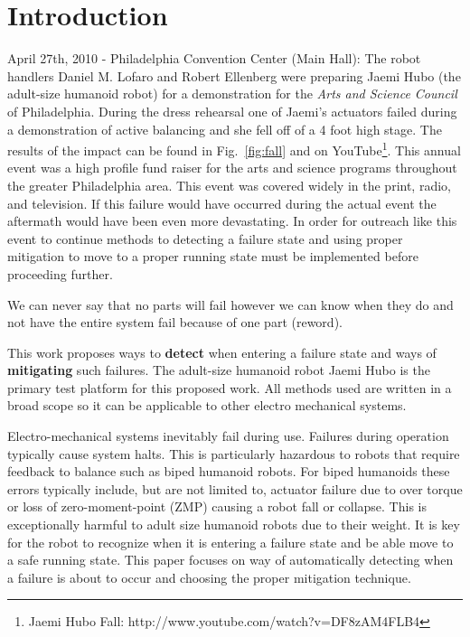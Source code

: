 \section{Introduction}

April 27th, 2010 - Philadelphia Convention Center (Main Hall):  The robot handlers Daniel M. Lofaro and Robert Ellenberg were preparing Jaemi Hubo (the adult-size humanoid robot) for a demonstration for the \textit{Arts and Science Council} of Philadelphia.  During the dress rehearsal one of Jaemi's actuators failed during a demonstration of active balancing and she fell off of a 4 foot high stage.  The results of the impact can be found in Fig.~\ref{fig:fall} and on YouTube\footnote{Jaemi Hubo Fall: http://www.youtube.com/watch?v=DF8zAM4FLB4\label{link:fall}}.  This annual event was a high profile fund raiser for the arts and science programs throughout the greater Philadelphia area.  This event was covered widely in the print, radio, and television.  If this failure would have occurred during the actual event the aftermath would have been even more devastating.  In order for outreach like this event to continue methods to detecting a failure state and using proper mitigation to move to a proper running state must be implemented before proceeding further.

We can never say that no parts will fail however we can know when they do and not have the entire system fail because of one part (reword).

This work proposes ways to \textbf{detect} when entering a failure state and ways of \textbf{mitigating} such failures.  The adult-size humanoid robot Jaemi Hubo is the primary test platform for this proposed work.  All methods used are written in a broad scope so it can be applicable to other electro mechanical systems.




Electro-mechanical systems inevitably fail during use.  Failures during operation typically cause system halts.  This is particularly hazardous to robots that require feedback to balance such as biped humanoid robots.  For biped humanoids these errors typically include, but are not limited to, actuator failure due to over torque or loss of zero-moment-point (ZMP) \cite{zmp35} causing a robot fall or collapse.  This is exceptionally harmful to adult size humanoid robots due to their weight.  It is key for the robot to recognize when it is entering a failure state and be able move to a safe running state.  This paper focuses on way of automatically detecting when a failure is about to occur and choosing the proper mitigation technique.

